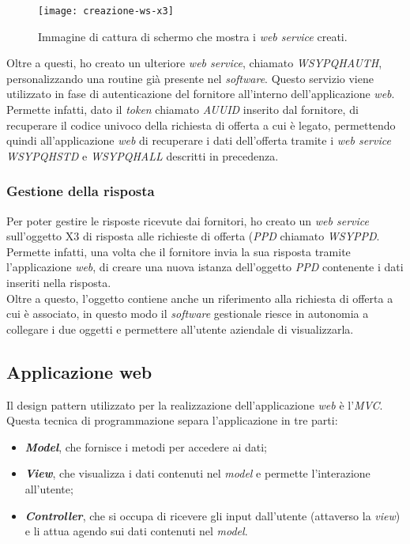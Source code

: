 \begin{figure}[htbp]
	\begin{center}
		\texttt{[image: creazione-ws-x3]}
		\caption{Immagine di cattura di schermo che mostra i \textit{web service} creati.}
	\end{center}
\end{figure}

Oltre a questi, ho creato un ulteriore \textit{web service}, chiamato \textit{WSYPQHAUTH}, personalizzando una routine già presente nel \textit{software}. 
Questo servizio viene utilizzato in fase di autenticazione del fornitore all'interno dell'applicazione \textit{web}. 
Permette infatti, dato il \textit{token} chiamato \textit{AUUID} inserito dal fornitore, di recuperare il codice univoco della richiesta di offerta a cui è legato, permettendo quindi all'applicazione \textit{web} di recuperare i dati dell'offerta tramite i \textit{web service} \textit{WSYPQHSTD} e \textit{WSYPQHALL} descritti in precedenza.

\subsubsection{Gestione della risposta}
Per poter gestire le risposte ricevute dai fornitori, ho creato un \textit{web service} sull'oggetto X3 di risposta alle richieste di offerta (\textit{PPD} chiamato \textit{WSYPPD}.
Permette infatti, una volta che il fornitore invia la sua risposta tramite l'applicazione \textit{web}, di creare una nuova istanza dell'oggetto \textit{PPD} contenente i dati inseriti nella risposta.\\
Oltre a questo, l'oggetto contiene anche un riferimento alla richiesta di offerta a cui è associato, in questo modo il \textit{software} gestionale riesce in autonomia a collegare i due oggetti e permettere all'utente aziendale di visualizzarla. 


\subsection{Applicazione web}
Il design pattern utilizzato per la realizzazione dell'applicazione \textit{web} è l'\textit{MVC}.
Questa tecnica di programmazione separa l'applicazione in tre parti:
\begin{itemize}
	\item \textbf{\textit{Model}}, che fornisce i metodi per accedere ai dati;
	\item \textbf{\textit{View}}, che visualizza i dati contenuti nel \textit{model} e permette l'interazione all'utente;
	\item \textbf{\textit{Controller}}, che si occupa di ricevere gli input dall'utente (attaverso la \textit{view}) e li attua agendo sui dati contenuti nel \textit{model}.
\end{itemize}

